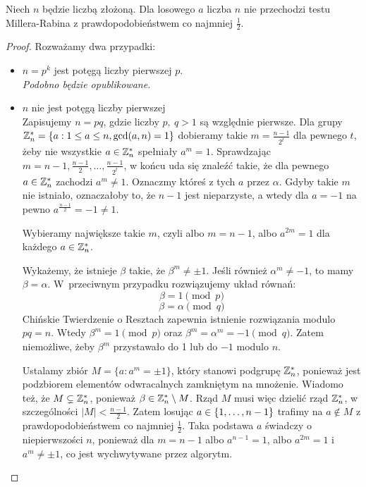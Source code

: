 \newpage
\begin{lemma}
    Niech \( n \) będzie liczbą złożoną. Dla losowego \( a \) liczba \( n \) nie przechodzi testu Millera-Rabina z prawdopodobieństwem co najmniej \( \frac{1}{2} \).
\end{lemma}
\begin{proof}
    Rozważamy dwa przypadki:
    \begin{itemize}
        \item \( n = p^k \) jest potęgą liczby pierwszej \( p \). \\
        \textit{Podobno będzie opublikowane.}
        \item \( n \) nie jest potęgą liczby pierwszej \\
        Zapisujemy \( n = pq \), gdzie liczby \( p, \ q > 1 \) są względnie pierwsze.    
        Dla grupy \linebreak \( \integer_n^* = \set{a : 1 \le a \le n, \gcd(a,n) = 1} \) dobieramy takie \( m = \frac{n-1}{2^t} \) dla pewnego \( t \), żeby nie wszystkie \( a \in \mathbb{Z}_n^* \) spełniały \( a^m = 1 \).
        Sprawdzając \( m = n-1, \frac{n-1}{2}, \dots, \frac{n-1}{2^t} \), w końcu uda się znaleźć takie, że dla pewnego \( a \in \mathbb{Z}_n^* \) zachodzi \( a^m \neq 1 \). Oznaczmy któreś z tych \( a \) przez \( \alpha \). Gdyby takie \( m \) nie istniało, oznaczałoby to, że \( n-1 \) jest nieparzyste, a wtedy dla \( a = -1\)  na pewno \( a^{\frac{n-1}{2}} = -1 \ne 1 \).
    
        Wybieramy największe takie \( m \), czyli albo \( m = n - 1 \), albo \( a^{2m} = 1 \) dla każdego \( a \in \mathbb{Z}_n^* \).
    
        Wykażemy, że istnieje \( \beta \) takie, że \( \beta^m \neq \pm 1 \). Jeśli również \( \alpha^m \neq -1 \), to mamy \( \beta = \alpha \). W~przeciwnym przypadku rozwiązujemy układ równań:
        \[
            \beta = 1 \pmod{p}
        \]
        \[
            \beta = \alpha \pmod{q}
        \]
        Chińskie Twierdzenie o Resztach zapewnia istnienie rozwiązania modulo \( pq = n \). Wtedy \( \beta^m = 1 \pmod{p} \) oraz \( \beta^m = \alpha^m = -1 \pmod{q} \).
        Zatem niemożliwe, żeby \( \beta^m \) przystawało do 1 lub do \( -1 \) modulo \( n \).
    
        Ustalamy zbiór \( M = \{a : a^m = \pm 1\} \), który stanowi podgrupę \( \mathbb{Z}_n^* \), ponieważ jest podzbiorem elementów odwracalnych zamkniętym na mnożenie.
        Wiadomo też, że \( M \subsetneq \mathbb{Z}_n^* \), ponieważ \( \beta \in \mathbb{Z}_n^* \setminus M \). Rząd \( M \) musi więc dzielić rząd \( \mathbb{Z}_n^* \), w szczególności \( |M| < \frac{n-1}{2} \).
        Zatem losując \( a \in \set{1, \dots, n-1} \) trafimy na \( a \notin M \) z prawdopodobieństwem co najmniej \( \frac{1}{2} \). Taka podstawa \( a \) świadczy o niepierwszości \( n \), ponieważ dla \( m = n-1 \) albo \( a^{n-1} = 1 \), albo \( a^{2m} = 1 \) i \( a^m \neq \pm 1 \), co jest wychwytywane przez algorytm.
    \end{itemize}
\end{proof}
